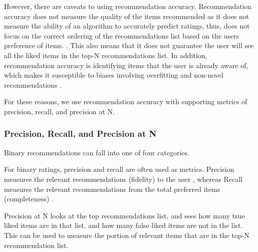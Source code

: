 However, there are caveats to using recommendation accuracy. Recommendation accuracy does not measure the quality of the items recommended as it does not measure the ability of an algorithm to accurately predict ratings, thus, does not focus on the correct ordering of the recommendations list based on the users preference of items. . This also means that it does not guarantee the user will see all the liked items in the top-N recommendations list. In addition, recommendation accuracy is identifying items that the user is already aware of, which makes it susceptible to biases involving overfitting and non-novel recommendations \cite{evaluation}. 

For these reasons, we use recommendation accuracy with supporting metrics of precision, recall, and precision at N. 

\subsubsection{Precision, Recall, and Precision at N}

Binary recommendations can fall into one of four categories. 

For binary ratings, precision and recall are often used as metrics. Precision measures the relevant recommendations (fidelity) to the user , whereas Recall measures the relevant recommendations from the total preferred items (completeness) . 

Precision at N looks at the top recommendations list, and sees how many true liked items are in that list, and how many false liked items are not in the list. This can be used to measure the portion of relevant items that are in the top-N recommendation list.


